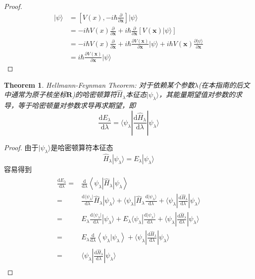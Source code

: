 \documentclass[12pt,a4paper,openany,twoside]{book}
\newtheorem{theorem}{Theorem}[section]
\numberwithin{equation}{section}
\newcommand{\ket}[1]{| #1 \rangle}
\begin{document}
\begin{proof}
    \begin{align*}
    [V(\textbf{x}),\textbf{p}] \ket{\psi} & = [V(x),-i\hbar \frac{\partial}{\partial \textbf{x}}]\ket{\psi}\\
    & = -i\hbar V(x) \frac{\partial }{\partial \textbf{x}} + i\hbar \frac{\partial}{\partial \textbf{x}}[V(\textbf{x})\ket{\psi}]\\
    &= -i\hbar V(x) \frac{\partial }{\partial \textbf{x}}+ i\hbar \frac{\partial V(\textbf{x})}{\partial \textbf{x}}\ket{\psi} +  i\hbar V(\textbf{x}) \frac{\partial \ket{\psi}}{\partial \textbf{x}}\\
    &= i\hbar \frac{\partial V(\textbf{x})}{\partial \textbf{x}} \ket{\psi}
    \end{align*}
  \end{proof}

  \begin{theorem}
    Hellmann-Feynman Theorem:
    对于依赖某个参数$\lambda$(在本指南的后文中通常为原子核坐标$\mathbf{R}$)的哈密顿算符$\hat{H}_\lambda$本征态$|\psi_\lambda\rangle$，其能量期望值对参数的求导，等于哈密顿量对参数求导再求期望，即
    \begin{equation}
      \frac{\mathrm{d}E_\lambda}{\mathrm{d}\lambda} = \langle\psi_\lambda|\frac{\mathrm{d}\hat{H}_\lambda}{\mathrm{d}\lambda}|\psi_\lambda\rangle
    \end{equation}
  \end{theorem}

  \begin{proof}
    由于$|\psi_\lambda\rangle$是哈密顿算符本征态
    \begin{equation*}
      \hat{H}_\lambda|\psi_\lambda\rangle=E_\lambda|\psi_\lambda\rangle
    \end{equation*}  
    容易得到
    \begin{align*}
      \begin{aligned}
        \frac{\mathrm{d} E_{\lambda}}{\mathrm{d} \lambda}=&\frac{\mathrm{d}}{\mathrm{d} \lambda}\left\langle\psi_{\lambda}\left|\hat{H}_{\lambda}\right| \psi_{\lambda}\right\rangle\\
        =&\frac{\mathrm{d} \langle\psi_\lambda|}{\mathrm{d} \lambda}\hat{H}_\lambda|\psi_\lambda\rangle+\langle\psi_\lambda|\hat{H}_\lambda\frac{\mathrm{d} |\psi_\lambda\rangle}{\mathrm{d} \lambda}+\langle\psi_\lambda|\frac{\mathrm{d}\hat{H}_\lambda}{\mathrm{d}\lambda}|\psi_\lambda\rangle\\
        =&E_\lambda\frac{\mathrm{d} \langle\psi_\lambda|}{\mathrm{d} \lambda}|\psi_\lambda\rangle+E_\lambda\langle\psi_\lambda|\frac{\mathrm{d} |\psi_\lambda\rangle}{\mathrm{d} \lambda}+\langle\psi_\lambda|\frac{\mathrm{d}\hat{H}_\lambda}{\mathrm{d}\lambda}|\psi_\lambda\rangle\\
        =&E_\lambda\frac{\mathrm{d}}{\mathrm{d}\lambda}\left\langle\psi_{\lambda} | \psi_{\lambda}\right\rangle+\langle\psi_\lambda|\frac{\mathrm{d}\hat{H}_\lambda}{\mathrm{d}\lambda}|\psi_\lambda\rangle\\
        =&\langle\psi_\lambda|\frac{\mathrm{d}\hat{H}_\lambda}{\mathrm{d}\lambda}|\psi_\lambda\rangle
      \end{aligned}
    \end{align*}
  \end{proof}
\end{document}
